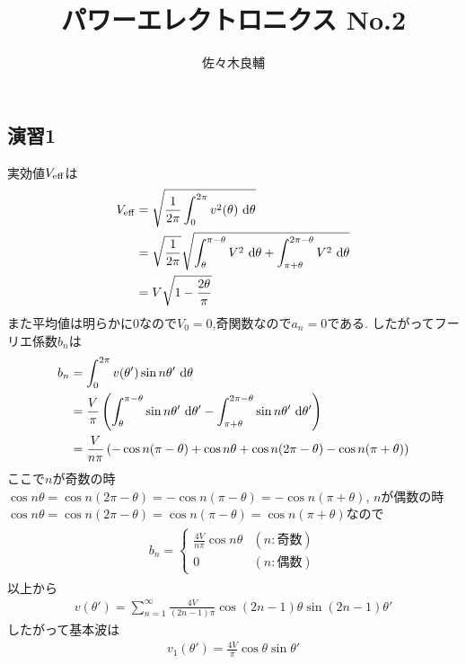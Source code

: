 \documentclass[uplatex,a4j,11pt,dvipdfmx]{jsarticle}
\begin{document}
\title{パワーエレクトロニクス No.2}
\author{佐々木良輔}
\date{}
\maketitle
\subsection*{演習1}
実効値$V_{\rm eff}$は
\begin{align}
  \begin{split}
    V_{\rm eff}&=\sqrt{\frac{1}{2\pi}\int_0^{2\pi}v^2(\theta)\ {\rm d}\theta}\\
    &=\sqrt{\frac{1}{2\pi}}\sqrt{\int_\theta^{\pi-\theta}V^2\ {\rm d}\theta+\int^{2\pi-\theta}_{\pi+\theta}V^2\ {\rm d}\theta}\\
    &=V\sqrt{1-\frac{2\theta}{\pi}}
  \end{split}
\end{align}
また平均値は明らかに0なので$V_0=0$,奇関数なので$a_n=0$である.
したがってフーリエ係数$b_n$は
\begin{align}
  \begin{split}
    b_n&=\int_0^{2\pi}v(\theta')\sin n\theta'\ {\rm d}\theta\\
    &=\frac{V}{\pi}\left(\int_\theta^{\pi-\theta}\sin n\theta'\ {\rm d}\theta'-\int_{\pi+\theta}^{2\pi-\theta}\sin n\theta'\ {\rm d}\theta'\right)\\
    &=\frac{V}{n\pi}\left(-\cos n(\pi-\theta)+\cos n\theta+\cos n(2\pi-\theta)-\cos n(\pi+\theta)\right)
  \end{split}
\end{align}
ここで$n$が奇数の時$\cos n\theta=\cos n(2\pi-\theta)=-\cos n(\pi-\theta)=-\cos n(\pi+\theta)$,
$n$が偶数の時$\cos n\theta=\cos n(2\pi-\theta)=\cos n(\pi-\theta)=\cos n(\pi+\theta)$なので
\begin{align}
  \begin{split}
    b_n=\begin{cases}
      \frac{4V}{n\pi}\cos n\theta & (n:奇数)\\
      0 & (n:偶数)
    \end{cases}
  \end{split}
\end{align}
以上から
\begin{align}
  v(\theta')=\sum_{n=1}^{\infty} \frac{4V}{(2n-1)\pi}\cos(2n-1)\theta\sin(2n-1)\theta'
\end{align}
したがって基本波は
\begin{align}
  v_1(\theta')=\frac{4V}{\pi}\cos\theta\sin\theta'
\end{align}
\end{document}
